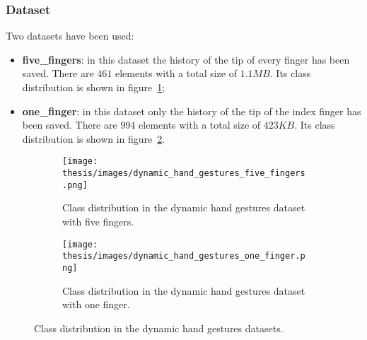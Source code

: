 \documentclass[../thesis.tex]{subfiles}
\begin{document}
\subsubsection{Dataset}
Two datasets have been used:
\begin{itemize}
    \item \textbf{five\_fingers}: in this dataset the history of the tip of every finger has been saved. There are $461$ elements with a total size of $1.1MB$. Its class distribution is shown in figure~\ref{fig:class_distribution_dynamic_hand_gestures_five_fingers};
    \item \textbf{one\_finger}: in this dataset only the history of the tip of the index finger has been saved. There are $994$ elements with a total size of $423KB$. Its class distribution is shown in figure~\ref{fig:class_distribution_dynamic_hand_gestures_one_finger}.
\end{itemize}

\begin{figure}[H]
    \centering
    \begin{subfigure}[b]{0.45\textwidth}
        \centering
        \texttt{[image: thesis/images/dynamic\_hand\_gestures\_five\_fingers.png]}
        \caption{Class distribution in the dynamic hand gestures dataset with five fingers.}
        \label{fig:class_distribution_dynamic_hand_gestures_five_fingers}
    \end{subfigure}
    \hfill
    \begin{subfigure}[b]{0.45\textwidth}
        \centering
        \texttt{[image: thesis/images/dynamic\_hand\_gestures\_one\_finger.png]}
        \caption{Class distribution in the dynamic hand gestures dataset with one finger.}
        \label{fig:class_distribution_dynamic_hand_gestures_one_finger}
    \end{subfigure}
    \caption{Class distribution in the dynamic hand gestures datasets.}
    \label{fig:my_label}
\end{figure}
\end{document}
